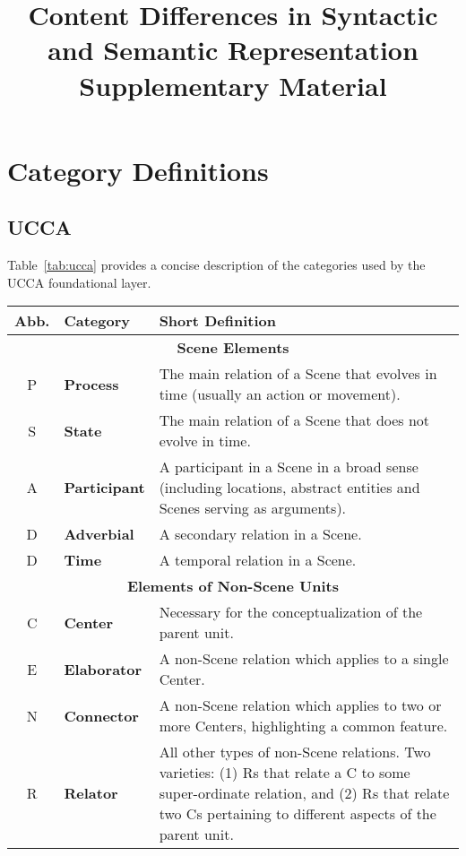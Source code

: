 \documentclass[11pt,a4paper]{article}
\title{Content Differences in Syntactic and Semantic Representation \\ Supplementary Material}
\date{}
\begin{document}
\maketitle


\section{Category Definitions}\label{sec:definitions}

\subsection{UCCA}

Table~\ref{tab:ucca} provides a concise description of the
categories used by the UCCA foundational layer.

\begin{table}[h]
\centering
\footnotesize
\begin {tabular}{|c|p{1.6cm}|p{12.5cm}|}
\hline
Abb. & Category & Short Definition\\
\hline
\hline
\multicolumn{3}{|c|}{{\bf Scene Elements}}\\
\hline
P & {\bf Process} & The main relation of a Scene that evolves in time (usually an action or movement).\\
\hline
S & {\bf State} & The main relation of a Scene that does not evolve in time.\\
\hline
A & {\bf Participant} & A participant in a Scene in a broad sense (including locations, abstract entities and Scenes serving as arguments).\\
\hline
D & {\bf Adverbial} & A secondary relation in a Scene.\\
\hline
D & {\bf Time} & A temporal relation in a Scene.\\
\hline
\hline
\multicolumn{3}{|c|}{{\bf Elements of Non-Scene Units}}\\
\hline
C & {\bf Center} & Necessary for the conceptualization of the parent unit.\\
\hline
E & {\bf Elaborator} & A non-Scene relation which applies to a single Center.\\
\hline
N & {\bf Connector} & A non-Scene relation which applies to two or more Centers, highlighting a common feature.\\
\hline
R & {\bf Relator} & All other types of non-Scene relations. Two varieties: (1) Rs that relate a C to some super-ordinate relation, and
(2) Rs that relate two Cs pertaining to different aspects of the parent unit. \\

\end{tabular}
\end{table}
\end{document}
